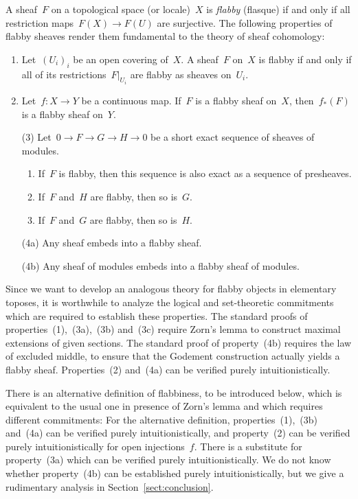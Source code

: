 \documentclass[oneside]{amsart}
\theoremstyle{definition}
\theoremstyle{plain}
\theoremstyle{remark}
\renewcommand{\_}{\mathpunct{.}\,}
\begin{document}
A sheaf~$F$ on a topological space (or locale)~$X$ is \emph{flabby} (flasque) if and only
if all restriction maps~$F(X) \to F(U)$ are surjective. The following
properties of flabby sheaves render them fundamental to the theory of sheaf
cohomology:
\begin{enumerate}
\item Let~$(U_i)_i$ be an open covering of~$X$.
A sheaf~$F$ on~$X$ is flabby if and only if all of its restrictions~$F|_{U_i}$
are flabby as sheaves on~$U_i$.
\item Let~$f : X \to Y$ be a continuous map. If~$F$ is a flabby sheaf on~$X$,
then~$f_*(F)$ is a flabby sheaf on~$Y$.
\item[(3)] Let~$0 \to F \to G \to H \to 0$ be a short exact sequence of sheaves of
modules.
\begin{enumerate}
\item If~$F$ is flabby, then this sequence is also exact as a sequence of
presheaves.
\item If~$F$ and~$H$ are flabby, then so is~$G$.
\item If~$F$ and~$G$ are flabby, then so is~$H$.
\end{enumerate}
\item[(4a)] Any sheaf embeds into a flabby sheaf.
\item[(4b)] Any sheaf of modules embeds into a flabby sheaf of modules.
\end{enumerate}

Since we want to develop an analogous theory for flabby objects in elementary
toposes, it is worthwhile to analyze the logical and set-theoretic commitments
which are required to establish these properties. The standard proofs of
properties~(1),~(3a),~(3b) and~(3c) require Zorn's lemma to construct maximal
extensions of given sections. The standard proof of property~(4b) requires the
law of excluded middle, to ensure that the Godement construction actually
yields a flabby sheaf. Properties~(2) and~(4a) can be verified purely
intuitionistically.

There is an alternative definition of flabbiness, to be introduced below, which
is equivalent to the usual one in presence of Zorn's lemma and which
requires different commitments: For the alternative definition,
properties~(1),~(3b) and~(4a) can be verified purely intuitionistically, and
property~(2) can be verified purely intuitionistically for open injections~$f$.
There is a substitute for property~(3a) which can be verified purely
intuitionistically. We do not know whether property~(4b) can be established
purely intuitionistically, but we give a rudimentary analysis in
Section~\ref{sect:conclusion}.
\end{document}
